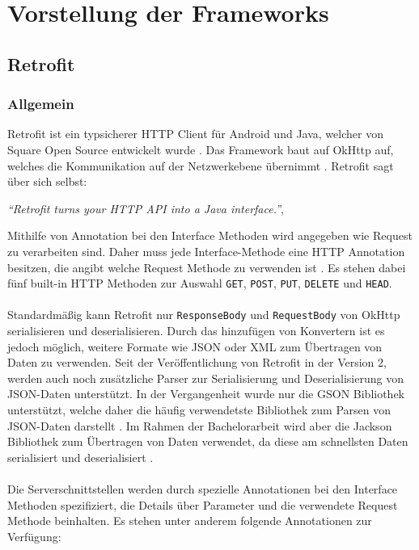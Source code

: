 \chapter{Vorstellung der Frameworks}
\label{chapter:frameworks}

\section{Retrofit}

\subsection{Allgemein}
Retrofit ist ein typsicherer HTTP Client für Android und Java, welcher von Square Open Source entwickelt wurde \cite{retrofit}. Das Framework baut auf OkHttp auf, welches die Kommunikation auf der Netzwerkebene übernimmt \cite{okhttp}. Retrofit sagt über sich selbst:

\begin{center}
	\textit{\textquotedblleft Retrofit turns your HTTP API into a Java interface.\textquotedblright}, \cite[Webseite von Retrofit]{retrofit} 
	\\
\end{center}

Mithilfe von Annotation bei den Interface Methoden wird angegeben wie Request zu verarbeiten sind. Daher muss jede Interface-Methode eine HTTP Annotation besitzen, die angibt welche Request Methode zu verwenden ist \cite{retrofit}. Es stehen dabei fünf built-in HTTP Methoden zur Auswahl \texttt{GET}, \texttt{POST}, \texttt{PUT}, \texttt{DELETE} und \texttt{HEAD}.
\\\\
Standardmäßig kann Retrofit nur \texttt{ResponseBody} und \texttt{RequestBody} von OkHttp serialisieren und deserialisieren. Durch das hinzufügen von Konvertern ist es jedoch möglich, weitere Formate wie JSON oder XML zum Übertragen von Daten zu verwenden. Seit der Veröffentlichung von Retrofit in der Version 2, werden auch noch zusätzliche Parser zur Serialisierung und Deserialisierung von JSON-Daten unterstützt. In der Vergangenheit wurde nur die GSON Bibliothek unterstützt, welche daher die häufig verwendetste Bibliothek zum Parsen von JSON-Daten darstellt \cite{consumingRetrofit}. Im Rahmen der Bachelorarbeit wird aber die Jackson Bibliothek zum Übertragen von Daten verwendet, da diese am schnellsten Daten serialisiert und deserialisiert  \cite{json:evaluation}.
\\\\
Die Serverschnittstellen werden durch spezielle Annotationen bei den Interface Methoden spezifiziert, die Details über Parameter und die verwendete Request Methode beinhalten. Es stehen unter anderem folgende Annotationen zur Verfügung:

